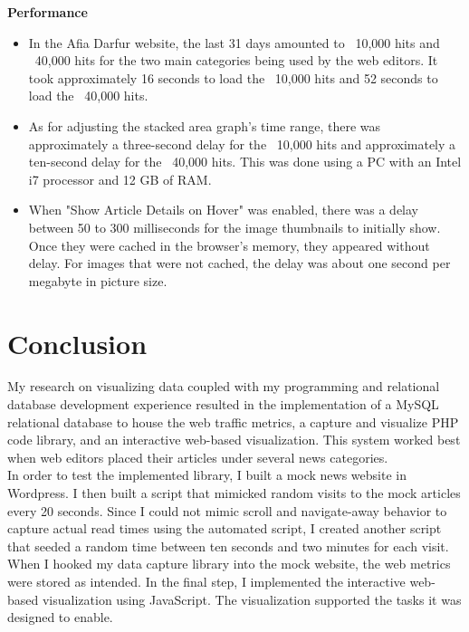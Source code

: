 \documentclass[12pt]{article}
\begin{document}
{\vspace{0.2in}

\noindent\textbf{Performance}
\begin{itemize}
\item In the Afia Darfur website, the last 31 days amounted to ~10,000 hits and ~40,000 hits for the two main categories being used by the web editors. It took approximately 16 seconds to load the ~10,000 hits and 52 seconds to load the ~40,000 hits. 
\item As for adjusting the stacked area graph's time range, there was approximately a three-second delay for the ~10,000 hits and approximately a ten-second delay for the ~40,000 hits. This was done using a PC with an Intel i7 processor and 12 GB of RAM. 
\item When "Show Article Details on Hover" was enabled, there was a delay between 50 to 300 milliseconds for the image thumbnails to initially show. Once they were cached in the browser's memory, they appeared without delay. For images that were not cached, the delay was about one second per megabyte in picture size.
\end{itemize}

\newpage

\section{Conclusion}
My research on visualizing data coupled with my programming and relational database development experience resulted in the implementation of a  MySQL relational database to house the web traffic metrics, a capture and visualize PHP code library, and an interactive web-based visualization. This system worked best when web editors placed their articles under several news categories.  \\ 

In order to test the implemented library, I built a mock news website in Wordpress. I then built a script that mimicked random visits to the mock articles every 20 seconds. Since I could not mimic scroll and navigate-away behavior to capture actual read times using the automated script, I created another script that seeded a random time between ten seconds and two minutes for each visit. \\ When I hooked my data capture library into the mock website, the web metrics were stored as intended. 
In the final step, I implemented the interactive web-based visualization using JavaScript. The visualization supported the tasks it was designed to enable. \\

}
\end{document}
